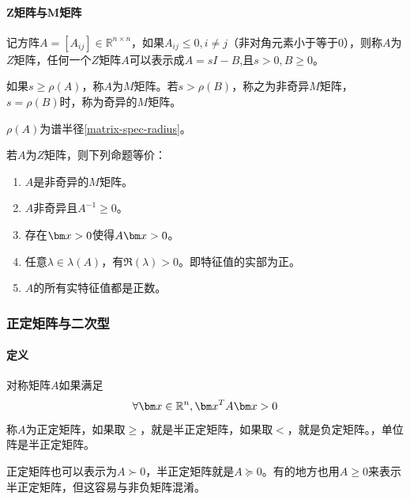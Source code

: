 \paragraph*{Z矩阵与M矩阵}
\begin{definition}[Z矩阵与M矩阵]\label{z-m-matrix}
记方阵$A=[A_{ij}]\in\mathbb{R}^{n\times n}$，如果$A_{ij}\leq 0,i\neq j$（非对角元素小于等于0），则称$A$为$Z$矩阵，任何一个$Z$矩阵$A$可以表示成$A=sI-B$,且$s>0,B\geq 0$。

如果$s\geq \rho(A)$，称$A$为$M$矩阵。若$s>\rho(B)$，称之为非奇异$M$矩阵，$s=\rho(B)$时，称为奇异的$M$矩阵。

$\rho(A)$为谱半径\ref{matrix-spec-radius}。
\end{definition}

\begin{theorem}[Z矩阵的性质]
若$A$为$Z$矩阵，则下列命题等价：
\begin{enumerate}
\item $A$是非奇异的$M$矩阵。
\item $A$非奇异且$A^{-1}\geq 0$。
\item 存在$\bx>0$使得$A\bx>0$。
\item 任意$\lambda\in\lambda(A)$，有$\Re(\lambda)>0$。即特征值的实部为正。
\item $A$的所有实特征值都是正数。
\end{enumerate}
\end{theorem}
\subsubsection{正定矩阵与二次型}
\paragraph*{定义}
\begin{definition}[正定矩阵]\label{pos-definite-matrix}
对称矩阵$A$如果满足
$$\forall \bx\in\mathbb{R}^n,\bx^TA\bx> 0$$
称$A$为正定矩阵，如果取$\geq$，就是半正定矩阵，如果取$<$，就是负定矩阵。，单位阵是半正定矩阵。

正定矩阵也可以表示为$A\succ 0$，半正定矩阵就是$A\succeq 0$。有的地方也用$A\geq 0$来表示半正定矩阵，但这容易与非负矩阵混淆。

\end{definition}
